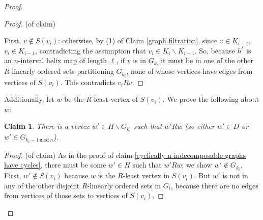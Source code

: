 \documentclass{amsart}
\newtheorem{claim}[theorem]{Claim}
\theoremstyle{definition}
\theoremstyle{remark}
\numberwithin{equation}{section}
\begin{document}
\begin{proof}
\begin{proof}(of claim)

First, $v \notin S(v_{i})$: otherwise, by (1) of Claim \ref{graph filtration}, since $v \in K_{i-1}$, $v_{i} \in K_{i-1}$, contradicting the assumption that $v_{i} \in K_{i} \backslash K_{i-1}$. So, because $h^{\ell}$ is an $n$-interval helix map of length $\ell$, if $v$ is in $G_{k_{i}}$ it must be in one of the other $R$-linearly ordered sets partitioning $G_{k_{i}}$, none of whose vertices have edges from vertices of $S(v_{i})$. This contradicts $v_{i} R v$.


    
\end{proof}

Additionally, let $w$ be the $R$-least vertex of $S(v_{i})$. We prove the following about $w$:


\begin{claim}\label{vertex pointing into least vertex}
    There is a vertex $w' \in H \backslash G_{k_{i}}$ such that $w' R w$ (so either $w' \in D$ or $w' \in G_{k_{i}-1 \mathrm{\:mod\:} n}$).
\end{claim}

\begin{proof}(of claim)
As in the proof of claim \ref{cyclically n-indecomposable graphs have cycles}, there must be some $w' \in H$ such that $w' R w$; we show $w' \notin G_{k_{i}}$. First, $w' \notin S(v_{i})$ because $w$ is the $R$-least vertex in $S(v_{i})$. But $w'$ is not in any of the other disjoint $R$-linearly ordered sets in $G_{i}$, because there are no edges from vertices of those sets to vertices of $S(v_{i})$.

    
\end{proof}


\end{proof}
\end{document}
